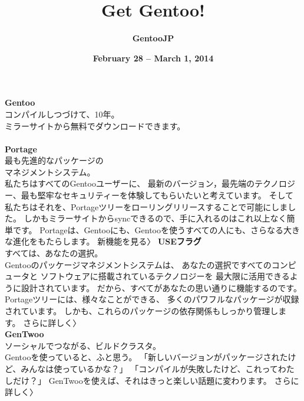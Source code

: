 \documentclass[10pt,foldmark,notumble]{leaflet}
\title{\bf Get Gentoo!}
\author{\bf GentooJP}
\date{\bf February 28 -- March 1, 2014 }
\begin{document}
\maketitle

\thispagestyle{empty}

{\centering
	\textcolor{GentooDarkPurple}{
		{\bf \large Gentoo} \\
		{コンパイルしつづけて、10年。} \\
		{\small ミラーサイトから無料でダウンロードできます。} \\
		\vspace{2mm}
		 \\
	}
	\vspace{70mm}
	\textcolor{GentooWhite}{
		{\bf \large Portage} \\
		{最も先進的なパッケージの} \\
		{マネジメントシステム。} \\
		{\small
			私たちはすべてのGentooユーザーに、
			最新のバージョン，最先端のテクノロジー、最も堅牢なセキュリティーを体験してもらいたいと考えています。
			そして私たちはそれを、Portageツリーをローリングリリースすることで可能にしました。
			しかもミラーサイトからsyncできるので、手に入れるのはこれ以上なく簡単です。
			Portageは、Gentooにも、Gentooを使うすべての人にも、さらなる大きな進化をもたらします。
			新機能を見る〉
		}
	}
}
\newpage
{\centering
	\textcolor{GentooBlack}{
		{\bf \large USEフラグ} \\
		{すべては、あなたの選択。} \\
		{\small
			Gentooのパッケージマネジメントシステムは、
			あなたの選択ですべてのコンピュータと
			ソフトウェアに搭載されているテクノロジーを
			最大限に活用できるように設計されています。
			だから、すべてがあなたの思い通りに機能するのです。
			Portageツリーには、様々なことができる、
			多くのパワフルなパッケージが収録されています。
			しかも、これらのパッケージの依存関係もしっかり管理します。
			さらに詳しく〉
		} \\
	}
}
\newpage
{\centering
	\textcolor{GentooBlack}{
		{\bf \large GenTwoo} \\
		{ソーシャルでつながる、ビルドクラスタ。} \\
		{\small
			Gentooを使っていると、ふと思う。
			「新しいバージョンがパッケージされたけど、みんなは使っているかな？」
			「コンパイルが失敗したけど、これってわたしだけ？」
			GenTwooを使えば、それはきっと楽しい話題に変わります。
			さらに詳しく〉
		} \\
	}
}
\newpage
\end{document}
